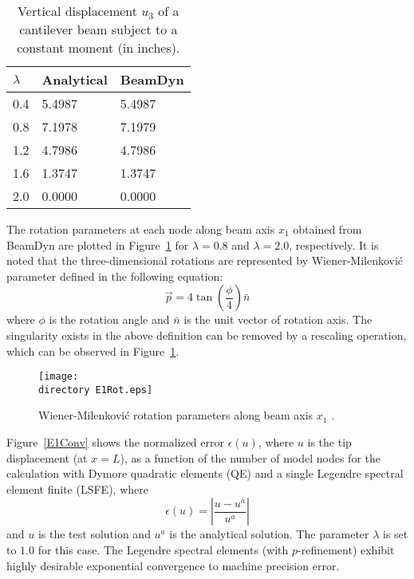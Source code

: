 \begin{table}[tbp]
\centering 
\caption{Vertical displacement $u_3$ of a cantilever beam subject to a constant moment (in inches).}
\label{E1u3} 
	\begin{tabular}{| l | l | l | }
    	\hline
    	$\lambda$ & Analytical & BeamDyn  \\ \hline
    	0.4       & 5.4987     & 5.4987   \\ \hline
    	0.8       & 7.1978     & 7.1979   \\ \hline
    	1.2       & 4.7986     & 4.7986   \\ \hline
    	1.6       & 1.3747     & 1.3747   \\ \hline
    	2.0       & 0.0000     & 0.0000   \\ \hline
    \end{tabular}
 \end{table}
 The rotation parameters at each node along beam axis $x_1$ obtained from BeamDyn are plotted in Figure~\ref{E1Rot} for $\lambda = 0.8$ and $\lambda = 2.0$, respectively. It is noted that the three-dimensional rotations are represented by Wiener-Milenkovi\'c parameter defined in the following equation:
 \begin{equation}
     \vec{p} = 4 \tan\left(\frac{\phi}{4} \right) \bar{n} 
     \label{WMParameter}
 \end{equation}
 where $\phi$ is the rotation angle and $\bar{n}$ is the unit vector of rotation axis. The singularity exists in the above definition can be removed by a rescaling operation, which can be observed in Figure~\ref{E1Rot}.
\begin{figure}
    \centering
    \texttt{[image: \\directory E1Rot.eps]}
    \caption{Wiener-Milenkovi\'c rotation parameters along beam axis $x_1$ .}
    \label{E1Rot}
\end{figure}
Figure~\ref{E1Conv} shows the normalized error $\epsilon(u)$, where $u$ is
the tip displacement (at $x=L$), as a function of the number of model nodes
for the calculation with Dymore quadratic elements (QE) and a single
Legendre spectral element finite (LSFE), where
\begin{equation}
    \label{E1Error}
    \epsilon(u) = \left| \frac{u-u^a}{u^a} \right|
\end{equation}
and $u$ is the test solution and $u^a$ is the analytical solution. The parameter $\lambda$ is set to $1.0$ for this case. The Legendre spectral elements (with $p$-refinement) exhibit highly desirable exponential convergence to machine precision error.
